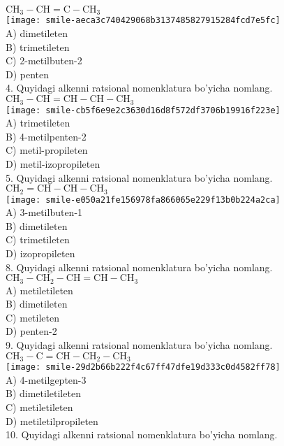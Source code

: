 $\mathrm{CH}_{3}-\mathrm{CH}=\mathrm{C}-\mathrm{CH}_{3}$\\
\texttt{[image: smile-aeca3c740429068b3137485827915284fcd7e5fc]}\\
A) dimetileten\\
B) trimetileten\\
C) 2-metilbuten-2\\
D) penten\\
4. Quyidagi alkenni ratsional nomenklatura bo'yicha nomlang.\\
$\mathrm{CH}_{3}-\mathrm{CH}=\mathrm{CH}-\mathrm{CH}-\mathrm{CH}_{3}$\\
\texttt{[image: smile-cb5f6e9e2c3630d16d8f572df3706b19916f223e]}\\
A) trimetileten\\
B) 4-metilpenten-2\\
C) metil-propileten\\
D) metil-izopropileten\\
5. Quyidagi alkenni ratsional nomenklatura bo'yicha nomlang.\\
$\mathrm{CH}_{2}=\mathrm{CH}-\mathrm{CH}-\mathrm{CH}_{3}$\\
\texttt{[image: smile-e050a21fe156978fa866065e229f13b0b224a2ca]}\\
A) 3-metilbuten-1\\
B) dimetileten\\
C) trimetileten\\
D) izopropileten\\
8. Quyidagi alkenni ratsional nomenklatura bo'yicha nomlang.\\
$\mathrm{CH}_{3}-\mathrm{CH}_{2}-\mathrm{CH}=\mathrm{CH}-\mathrm{CH}_{3}$\\
A) metiletileten\\
B) dimetileten\\
C) metileten\\
D) penten-2\\
9. Quyidagi alkenni ratsional nomenklatura bo'yicha nomlang.\\
$\mathrm{CH}_{3}-\mathrm{C}=\mathrm{CH}-\mathrm{CH}_{2}-\mathrm{CH}_{3}$\\
\texttt{[image: smile-29d2b66b222f4c67ff47dfe19d333c0d4582ff78]}\\
A) 4-metilgepten-3\\
B) dimetiletileten\\
C) metiletileten\\
D) metiletilpropileten\\
10. Quyidagi alkenni ratsional nomenklatura bo'yicha nomlang.\\
